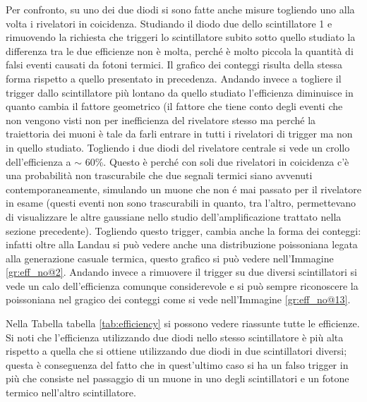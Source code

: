 Per confronto, su uno dei due diodi si sono fatte anche misure togliendo uno alla volta i rivelatori in coicidenza. Studiando il diodo due dello scintillatore 1 e rimuovendo la richiesta che triggeri lo scintillatore subito sotto quello studiato la differenza tra le due efficienze non è molta, perché è molto piccola la quantità di falsi eventi causati da fotoni termici. Il grafico dei conteggi risulta della stessa forma rispetto a quello presentato in precedenza. Andando invece a togliere il trigger dallo scintillatore più lontano da quello studiato l'efficienza diminuisce in quanto cambia il fattore geometrico (il fattore che tiene conto degli eventi che non vengono visti non per inefficienza del rivelatore stesso ma perché la traiettoria dei muoni è tale da farli entrare in tutti i rivelatori di trigger ma non in quello studiato. Togliendo i due diodi del rivelatore centrale si vede un crollo dell'efficienza a $\sim$ 60\%. Questo \`e perch\'e con soli due rivelatori in coicidenza c'\`e una probabilit\`a non trascurabile che due segnali termici siano avvenuti contemporaneamente, simulando un muone che non \'e mai passato per il rivelatore in esame (questi eventi non sono trascurabili in quanto, tra l'altro, permettevano di visualizzare le altre gaussiane nello studio dell'amplificazione trattato nella sezione precedente). Togliendo questo trigger, cambia anche la forma dei conteggi: infatti oltre alla Landau si può vedere anche una distribuzione poissoniana legata alla generazione casuale termica, questo grafico si può vedere nell'Immagine \ref{gr:eff_no@2}. Andando invece a rimuovere il trigger su due diversi scintillatori si vede un calo dell'efficienza comunque considerevole e si può sempre riconoscere la poissoniana nel gragico dei conteggi come si vede nell'Immagine \ref{gr:eff_no@13}.\\

Nella Tabella tabella \ref{tab:efficiency} si possono vedere riassunte tutte le efficienze. Si noti che l'efficienza utilizzando due diodi nello stesso scintillatore è più alta rispetto a quella che si ottiene utilizzando due diodi in due scintillatori diversi; questa è conseguenza del fatto che in quest'ultimo caso si ha un falso trigger in più che consiste nel passaggio di un muone in uno degli scintillatori e un fotone termico nell'altro scintillatore.

